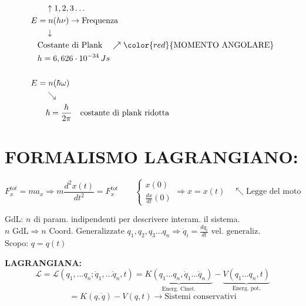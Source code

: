 \documentclass[12pt,a4paper]{article}
\begin{document}

\begin{align*}
    & \quad \uparrow 1, 2, 3\dots \\
    E &= n (h \nu) \rightarrow \text{Frequenza} \\
    & \quad \downarrow \\
    & \text{Costante di Plank} \quad \nearrow \color{red}{\text{MOMENTO ANGOLARE}} \\
    & h = 6,626 \cdot 10^{-34} \, Js \\
    \\
    E &= n (\hbar \omega) \\
    & \quad \searrow \\
    & \quad \hbar = \frac{h}{2\pi} \quad \text{costante di plank ridotta}
\end{align*}

\newpage
\section*{FORMALISMO LAGRANGIANO:}


\begin{equation*}
    F_x^{tot} = m a_x \Rightarrow m \frac{d^2 x(t)}{dt^2} = F_x^{tot} \qquad \begin{cases} x(0) \\ \frac{dx}{dt}(0) \end{cases} \Rightarrow x = x(t) \quad \nwarrow \text{Legge del moto}
\end{equation*}

\vspace{0.5cm}
\noindent GdL: $n$ di param. indipendenti per descrivere interam. il sistema. \\
$n \text{ GdL} \Rightarrow n \text{ Coord. Generalizzate } q_1, q_2, q_3 \dots q_n \Rightarrow \dot{q}_i = \frac{dq_i}{dt} \text{ vel. generaliz.}$ \\
Scopo: $q = q(t)$

\vspace{0.5cm}
\noindent \textbf{LAGRANGIANA:}
\begin{equation*}
    \mathcal{L} = \mathcal{L}(q_1, \dots q_n ; \dot{q}_1, \dots \dot{q}_n, t) = \underbrace{K(q_1 \dots q_n, \dot{q}_1 \dots \dot{q}_n)}_{\text{Energ. Cinet.}} - \underbrace{V(q_1 \dots q_n, t)}_{\text{Energ. pot.}}
\end{equation*}
\begin{equation*}
    = K(q, \dot{q}) - V(q, t) \longrightarrow \text{Sistemi conservativi}
\end{equation*}
\end{document}
